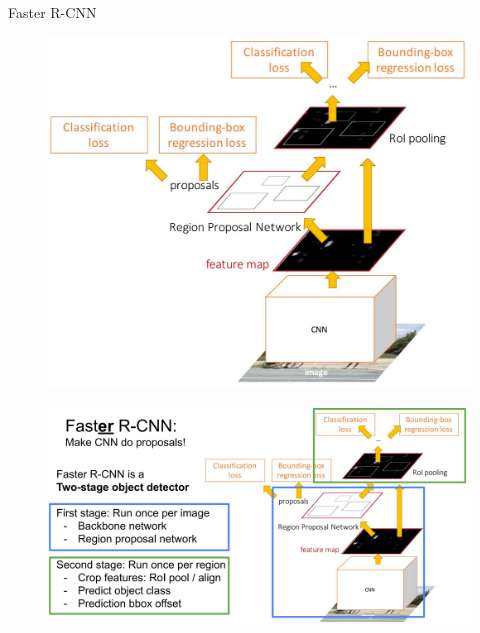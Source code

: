 \documentclass[10pt]{beamer}
\theoremstyle{remark}
\theoremstyle{definition}
\begin{document}
\begin{frame}[allowframebreaks]{Faster R-CNN}
\begin{figure}
\centering
\includegraphics[width=1.0\textwidth,height=0.9\textheight,keepaspectratio]{./images/faster_rcnn_1.png}
\end{figure}

\framebreak

\begin{figure}
\centering
\includegraphics[width=1.0\textwidth,height=1.0\textheight,keepaspectratio]{./images/faster_rcnn_2.png}
\end{figure}

\framebreak


\end{frame}
\end{document}
